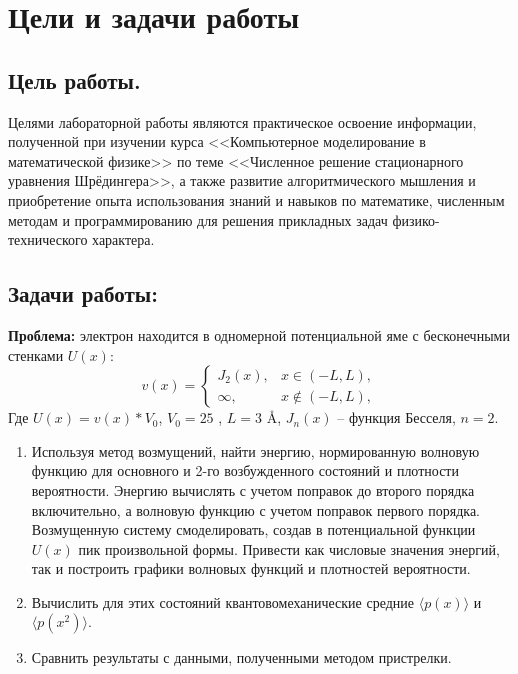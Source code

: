 \documentclass[a4paper,12pt]{article}
\begin{document}
\newpage
\tableofcontents
\pagestyle{plain}
\setcounter{page}{2}

\newpage
\section{Цели и задачи работы}\label{sec:goals}
\subsection{Цель работы.}\label{subsec:-.}
Целями лабораторной работы являются практическое освоение информации,
полученной при изучении курса <<Компьютерное моделирование в математической физике>> по теме <<Численное решение стационарного уравнения Шрёдингера>>,
а также развитие алгоритмического мышления и приобретение опыта использования знаний и навыков по математике,
численным методам и программированию для решения прикладных задач физико-технического характера.

\subsection{Задачи работы:}\label{subsec:-:}

\textbf{Проблема:} электрон находится в одномерной потенциальной яме с бесконечными стенками $U(x)$:
\[
v(x) =
    \begin{cases}
        J_2(x), & x \in (-L, L), \\
        \infty, & x \notin (-L, L),
    \end{cases}
\]
Где $U(x) = v(x)*V_0$, $V_0 = 25$ , $L = 3$ \AA, $J_n(x)$ -- функция Бесселя, $n = 2$.

\begin{enumerate}
    \item Используя метод возмущений, найти энергию, нормированную волновую функцию для основного и 2-го возбужденного состояний и плотности вероятности.
          Энергию вычислять с учетом поправок до второго порядка включительно, а волновую функцию с учетом поправок первого порядка.
          Возмущенную систему смоделировать, создав в потенциальной функции $U(x)$ пик произвольной формы.
          Привести как числовые значения энергий, так и построить графики волновых функций и плотностей вероятности.
    \item Вычислить для этих состояний квантовомеханические средние $\langle p(x) \rangle$ и $ \langle p(x^2) \rangle $.
    \item Сравнить результаты с данными, полученными методом пристрелки.
\end{enumerate}
\end{document}
